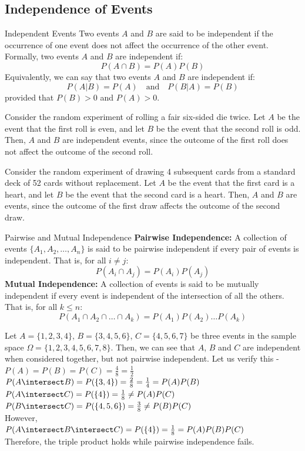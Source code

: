 \documentclass[openany]{book}
\begin{document}
\subsection{Independence of Events}
\begin{mydefinition}{Independent Events}
    Two events $A$ and $B$ are said to be independent if the occurrence of one event does not affect the occurrence of the other event. Formally, two events $A$ and $B$ are independent if:
    $$P(A \cap B) = P(A)P(B)$$
    Equivalently, we can say that two events $A$ and $B$ are independent if:
    $$P(A|B) = P(A) \quad \text{and} \quad P(B|A) = P(B)$$
    provided that $P(B) > 0$ and $P(A) > 0$.
\end{mydefinition}
\begin{example}
    Consider the random experiment of rolling a fair six-sided die twice. Let $A$ be the event that the first roll is even, and let $B$ be the event that the second roll is odd. Then, $A$ and $B$ are independent events, since the outcome of the first roll does not affect the outcome of the second roll.
\end{example}
\begin{example}
    Consider the random experiment of drawing 4 subsequent cards from a standard deck of 52 cards without replacement. Let $A$ be the event that the first card is a heart, and let $B$ be the event that the second card is a heart. Then, $A$ and $B$ are  events, since the outcome of the first draw affects the outcome of the second draw.
\end{example}
\begin{mydefinition}{Pairwise and Mutual Independence}
    \textbf{Pairwise Independence: } A collection of events $\{A_1, A_2, \ldots, A_n\}$ is said to be pairwise independent if every pair of events is independent. That is, for all $i \neq j$:
    $$P(A_i \cap A_j) = P(A_i)P(A_j)$$
    \textbf{Mutual Independence: } A collection of events is said to be mutually independent if every event is independent of the intersection of all the others. That is, for all $k \leq n$:
    $$P(A_1 \cap A_2 \cap \ldots \cap A_k) = P(A_1)P(A_2) \ldots P(A_k)$$
\end{mydefinition}
\begin{example}
    Let $A = \{1, 2 , 3, 4\}$, $B = \{3, 4, 5, 6\}$, $C = \{4, 5, 6, 7\}$ be three events in the sample space $\Omega = \{1, 2, 3, 4, 5, 6, 7, 8\}$. Then, we can see that $A$, $B$ and $C$ are independent when considered together, but not pairwise independent. Let us verify this - \\
    $P(A) = P(B) = P(C) = \frac{4}{8} = \frac{1}{2}$ \\
    $P(A\intersect B) = P(\{3, 4\}) = \frac{2}{8} = \frac{1}{4} = P(A)P(B)$ \\
    $P(A\intersect C) = P(\{4\}) = \frac{1}{8} \neq P(A)P(C)$ \\
    $P(B\intersect C) = P(\{4, 5, 6\}) = \frac{3}{8} \neq P(B)P(C)$ \\
    However, \\
    $P(A\intersect B \intersect C) = P(\{4\}) = \frac{1}{8} = P(A)P(B)P(C)$ \\
    Therefore, the triple product holds while pairwise independence fails. 
\end{example}
\end{document}

